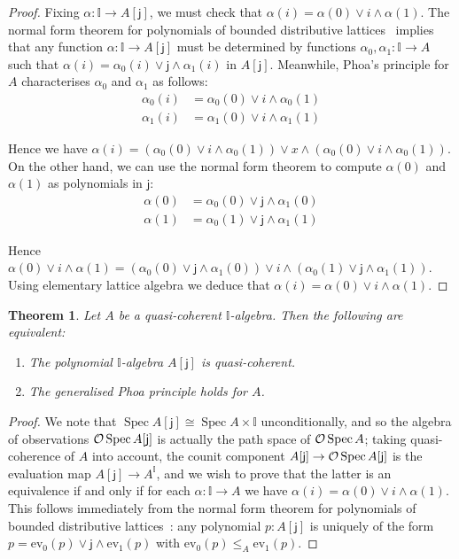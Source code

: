 \documentclass[a4paper,12pt]{amsart}
\newtheorem{theorem}{Theorem}[section]
\theoremstyle{definition}
\newcommand{\mbb}[1]{\mathbb{#1}}
\newcommand{\I}{\mbb I}
\newcommand{\ms}[1]{\mathsf{#1}}
\newcommand{\ev}{\mathrm{ev}}
\newcommand{\spec}{\operatorname{Spec}}
\begin{document}
\begin{proof}
  Fixing $\alpha\colon \I\to A[\ms{j}]$, we must check that $\alpha(i) = \alpha(0) \vee i \wedge \alpha(1)$. 
  The normal form theorem for polynomials of bounded distributive lattices~\citep[Ch.\ 1, Thm.\ 10.11]{lausch2000algebra} implies that any function $\alpha\colon \I\to A[\ms{j}]$ must be determined by functions $\alpha_0,\alpha_1\colon \I\to A$ such that $\alpha(i) = \alpha_0(i)\vee \ms{j} \wedge \alpha_1(i)$ in $A[\ms{j}]$. Meanwhile, Phoa's principle for $A$ characterises $\alpha_0$ and $\alpha_1$ as follows:
  \begin{align*}
    \alpha_0(i) &= \alpha_0(0) \vee i \wedge \alpha_0(1)
    \\ 
    \alpha_1(i) &= \alpha_1(0) \vee i \wedge \alpha_1(1)
  \end{align*}

  Hence we have $\alpha(i) = (\alpha_0(0) \vee i \wedge \alpha_0(1))\lor x \wedge (\alpha_0(0) \vee i \wedge \alpha_0(1))$. On the other hand, we can use the normal form theorem to compute $\alpha(0)$ and $\alpha(1)$ as polynomials in $\ms{j}$: 
  \begin{align*}
    \alpha(0) &= \alpha_0(0) \vee \ms{j}\wedge \alpha_1(0)\\
    \alpha(1) &= \alpha_0(1) \vee \ms{j}\wedge \alpha_1(1)
  \end{align*}

  Hence $\alpha(0)\lor i \wedge \alpha(1) = (\alpha_0(0) \vee \ms{j}\wedge \alpha_1(0))\vee i \wedge (\alpha_0(1) \vee \ms{j}\wedge \alpha_1(1))$. Using elementary lattice algebra we deduce that $\alpha(i) = \alpha(0) \vee i \wedge \alpha(1)$.
\end{proof}

\begin{theorem}\label{obs:sqcp-phoa-gen}
  Let $A$ be a quasi-coherent $\I$-algebra. Then the following are equivalent:
  \begin{enumerate}
    \item The polynomial $\I$-algebra $A[\ms{j}]$ is quasi-coherent.
    \item The generalised Phoa principle holds for $A$.
  \end{enumerate}
\end{theorem}

\begin{proof}
  We note that $\spec{A[\ms{j}]} \cong \spec{A}\times \I$ unconditionally, and so the algebra of observations $\opens\spec{A[\ms{j}]}$ is actually the path space of $\opens\spec{A}$; taking quasi-coherence of $A$ into account, the counit component $A[\ms{j}]\to \opens\spec A[\ms{j}]$ is the evaluation map $A[\ms{j}] \to A^\I$, and we wish to prove that the latter is an equivalence if and only if for each $\alpha\colon \I\to A$ we have $\alpha(i)=\alpha(0)\vee i\wedge\alpha(1)$. 
  This follows immediately from the normal form theorem for polynomials of bounded distributive lattices~\citep[Ch.\ 1, Thm.\ 10.11]{lausch2000algebra}: any polynomial $p:A[\ms{j}]$ is uniquely of the form $p = \ev_0(p) \vee \ms{j} \wedge \ev_1(p)$ with $\ev_0(p)\le_A \ev_1(p)$.
\end{proof}
\end{document}
